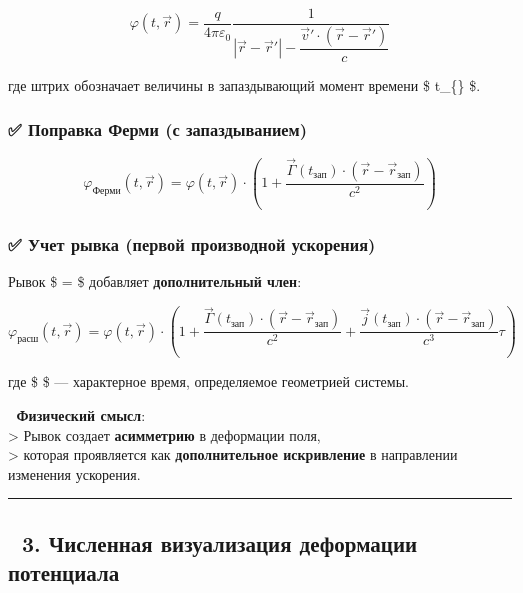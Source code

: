\documentclass[11pt]{article}
\begin{document}
\[
\varphi(t, \vec{r}) = \frac{q}{4\pi\varepsilon_0} \frac{1}{|\vec{r} - \vec{r}'| - \dfrac{\vec{v}' \cdot (\vec{r} - \vec{r}')}{c}}
\]

где штрих обозначает величины в запаздывающий момент времени \$
t\_\{\} \$.

\subsubsection{✅ Поправка Ферми (с
запаздыванием)}\label{ux43fux43eux43fux440ux430ux432ux43aux430-ux444ux435ux440ux43cux438-ux441-ux437ux430ux43fux430ux437ux434ux44bux432ux430ux43dux438ux435ux43c}

\[
\varphi_{\text{Ферми}}(t, \vec{r}) = \varphi(t, \vec{r}) \cdot \left(1 + \frac{\vec{\Gamma}(t_{\text{зап}}) \cdot (\vec{r} - \vec{r}_{\text{зап}})}{c^2}\right)
\]

\subsubsection{✅ Учет рывка (первой производной
ускорения)}\label{ux443ux447ux435ux442-ux440ux44bux432ux43aux430-ux43fux435ux440ux432ux43eux439-ux43fux440ux43eux438ux437ux432ux43eux434ux43dux43eux439-ux443ux441ux43aux43eux440ux435ux43dux438ux44f}

Рывок \$  =  \$ добавляет
\textbf{дополнительный член}:

\[
\boxed{
\varphi_{\text{расш}}(t, \vec{r}) = \varphi(t, \vec{r}) \cdot \left(1 + \frac{\vec{\Gamma}(t_{\text{зап}}) \cdot (\vec{r} - \vec{r}_{\text{зап}})}{c^2} + \frac{\vec{j}(t_{\text{зап}}) \cdot (\vec{r} - \vec{r}_{\text{зап}})}{c^3} \tau \right)
}
\]

где \$ \tau \$ --- характерное время, определяемое геометрией системы.

📌 \textbf{Физический смысл}:\\
\textgreater{} Рывок создает \textbf{асимметрию} в деформации поля,\\
\textgreater{} которая проявляется как \textbf{дополнительное
искривление} в направлении изменения ускорения.

\begin{center}\rule{0.5\linewidth}{\linethickness}\end{center}

\subsection{🔹 3. Численная визуализация деформации
потенциала}\label{ux447ux438ux441ux43bux435ux43dux43dux430ux44f-ux432ux438ux437ux443ux430ux43bux438ux437ux430ux446ux438ux44f-ux434ux435ux444ux43eux440ux43cux430ux446ux438ux438-ux43fux43eux442ux435ux43dux446ux438ux430ux43bux430}
\end{document}
